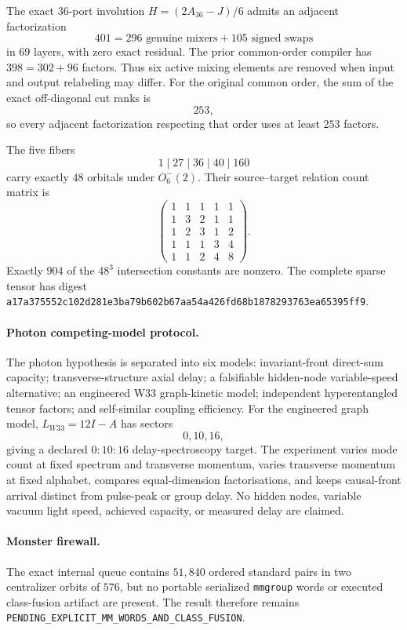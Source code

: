 \begin{theorem}
The exact $36$-port involution $H=(2A_{36}-J)/6$ admits an adjacent factorization
\[
401=296\text{ genuine mixers}+105\text{ signed swaps}
\]
in $69$ layers, with zero exact residual.  The prior common-order compiler has
$398=302+96$ factors.  Thus six active mixing elements are removed when input
and output relabeling may differ.  For the original common order, the sum of
the exact off-diagonal cut ranks is
\[
\boxed{253},
\]
so every adjacent factorization respecting that order uses at least $253$
factors.
\end{theorem}

\begin{theorem}
The five fibers
\[
1\mid27\mid36\mid40\mid160
\]
carry exactly $48$ orbitals under $O_6^-(2)$.  Their source--target relation
count matrix is
\[
\begin{pmatrix}
1&1&1&1&1\\
1&3&2&1&1\\
1&2&3&1&2\\
1&1&1&3&4\\
1&1&2&4&8
\end{pmatrix}.
\]
Exactly $904$ of the $48^3$ intersection constants are nonzero.  The complete
sparse tensor has digest
\texttt{a17a375552c102d281e3ba79b602b67aa54a426fd68b1878293763ea65395ff9}.
\end{theorem}

\paragraph{Photon competing-model protocol.}
The photon hypothesis is separated into six models: invariant-front direct-sum
capacity; transverse-structure axial delay; a falsifiable hidden-node
variable-speed alternative; an engineered W33 graph-kinetic model; independent
hyperentangled tensor factors; and self-similar coupling efficiency.  For the
engineered graph model, $L_{W33}=12I-A$ has sectors
\[
\boxed{0,10,16},
\]
giving a declared $0{:}10{:}16$ delay-spectroscopy target.  The experiment
varies mode count at fixed spectrum and transverse momentum, varies transverse
momentum at fixed alphabet, compares equal-dimension factorisations, and keeps
causal-front arrival distinct from pulse-peak or group delay.  No hidden nodes,
variable vacuum light speed, achieved capacity, or measured delay are claimed.

\paragraph{Monster firewall.}
The exact internal queue contains $51{,}840$ ordered standard pairs in two
centralizer orbits of $576$, but no portable serialized \texttt{mmgroup} words
or executed class-fusion artifact are present.  The result therefore remains
\texttt{PENDING\_EXPLICIT\_MM\_WORDS\_AND\_CLASS\_FUSION}.
